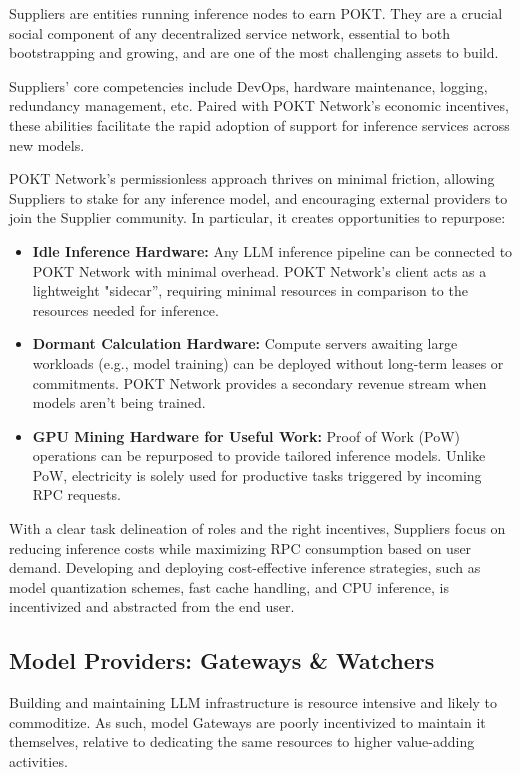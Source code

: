 \documentclass[conference,compsoc]{IEEEtran}
\begin{document}
Suppliers are entities running inference nodes to earn POKT. They are a crucial social component of any decentralized service network, essential to both bootstrapping and growing, and are one of the most challenging assets to build.

Suppliers' core competencies include DevOps, hardware maintenance, logging, redundancy management, etc. Paired with POKT Network’s economic incentives, these abilities facilitate the rapid adoption of support for inference services across new models.

POKT Network's permissionless approach thrives on minimal friction, allowing Suppliers to stake for any inference model, and encouraging external providers to join the Supplier community. In particular, it creates opportunities to repurpose:

\begin{itemize}
    \item \textbf{Idle Inference Hardware:} Any LLM inference pipeline can be connected to POKT Network with minimal overhead. POKT Network's client acts as a lightweight "sidecar”, requiring minimal resources in comparison to the resources needed for inference.
    \item \textbf{Dormant Calculation Hardware:} Compute servers awaiting large workloads (e.g., model training) can be deployed without long-term leases or commitments. POKT Network provides a secondary revenue stream when models aren't being trained.
    \item \textbf{GPU Mining Hardware for Useful Work:} Proof of Work (PoW) operations can be repurposed to provide tailored inference models. Unlike PoW, electricity is solely used for productive tasks triggered by incoming RPC requests.
\end{itemize}

With a clear task delineation of roles and the right incentives, Suppliers focus on reducing inference costs while maximizing RPC consumption based on user demand. Developing and deploying cost-effective inference strategies, such as model quantization schemes, fast cache handling, and CPU inference, is incentivized and abstracted from the end user.

\subsection{Model Providers: Gateways \& Watchers}

Building and maintaining LLM infrastructure is resource intensive and likely to commoditize. As such, model Gateways are poorly incentivized to maintain it themselves, relative to dedicating the same resources to higher value-adding activities.
\end{document}
